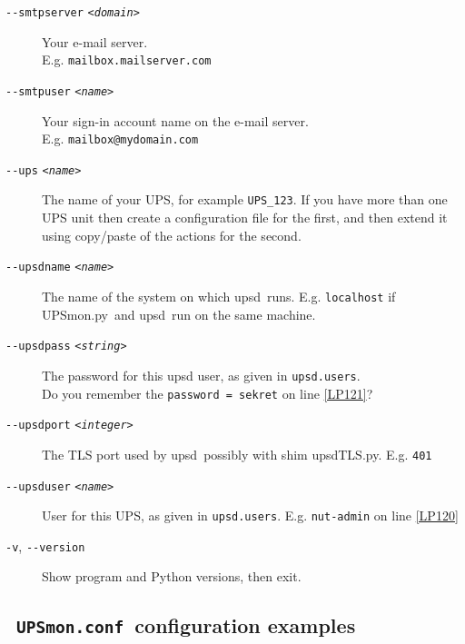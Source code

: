 \documentclass[12pt]{article}
\newlength{\headersep}\setlength{\headersep}{3mm}
\newcommand{\Hsep}{\hspace{\headersep}}
\newcommand{\newcolumn}{\vfill\eject}
\newcommand{\upsd}{\mbox{\textcolor{UPSDCOLOUR}{upsd}}}
\newcommand{\upsdTLS}{\mbox{\textcolor{UPSDCOLOUR}{upsdTLS.py}}}
\newcommand{\UPSmon}{\mbox{\textcolor{UPSMONCOLOUR}{UPSmon.py}}}
\newcommand{\ttit}[1]{\texttt{\textit{#1}}}
\newcommand{\upsdusers}{\textcolor{UPSDCOLOUR}{\texttt{upsd.users}}}
\newcommand{\UPSmonconf}{\textcolor{UPSMONCOLOUR}{\texttt{UPSmon.conf}}}
\begin{document}
\begin{description}
\item[\texttt{-\/-smtpserver} \ttit{<domain>}] \hspace{7mm} Your
  e-mail server. \\ E.g. \texttt{mailbox.mailserver.com}

\item[\texttt{-\/-smtpuser} \ttit{<name>}] \hspace{6mm} Your sign-in
  account name on the e-mail server. \\ E.g.
  \texttt{mailbox@mydomain.{\allowbreak}com}

\item[\texttt{-\/-ups} \ttit{<name>}] \hspace{7mm} The name of your
  UPS, for example \texttt{UPS\_123}.  If you have more than one UPS
  unit then create a configuration file for the first, and then extend
  it using copy/paste of the actions for the second.

\item[\texttt{-\/-upsdname} \ttit{<name>}] \hspace{3mm} The name of
  the system on which \upsd\ runs. E.g. \texttt{localhost} if
  \UPSmon\ and \upsd\ run on the same machine.

\item[\texttt{-\/-upsdpass} \ttit{<string>}] \hspace{7mm} The password
  for this upsd user, as given in \upsdusers. \\ Do you remember the
  \texttt{password = sekret} on line \ref{LP121}?

\item[\texttt{-\/-upsdport} \ttit{<integer>}] \hspace{7mm} The TLS
  port used by \upsd\ possibly with shim \upsdTLS. E.g. \texttt{401}

\item[\texttt{-\/-upsduser} \ttit{<name>}] \hspace{7mm} User for this
  UPS, as given in \upsdusers. E.g.  \texttt{nut-admin} on line
  \ref{LP120}

\item[\texttt{-v}, \texttt{-\/-version}] \hspace{7mm} Show program and
  Python versions, then exit.

\end{description}

\subsection{\Hsep\ \UPSmonconf\ configuration examples}\label{section:confex}
\end{document}

